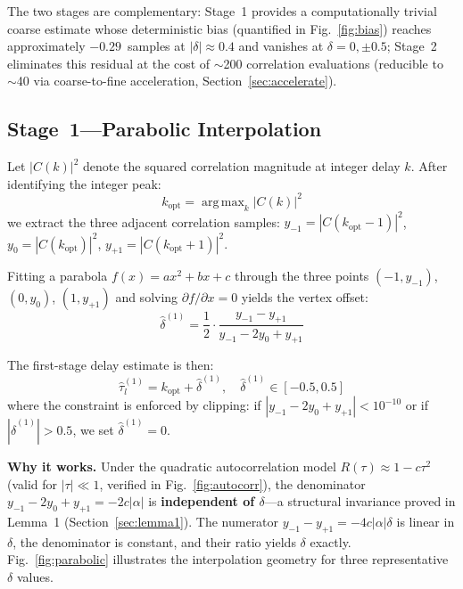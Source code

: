 \documentclass[journal]{IEEEtran}
\DeclareMathOperator*{\argmax}{arg\,max}
\begin{document}
The two stages are complementary: Stage~1 provides a computationally trivial coarse estimate whose deterministic bias (quantified in Fig.~\ref{fig:bias}) reaches approximately $-0.29$~samples at $|\delta|\approx0.4$ and vanishes at $\delta=0,\pm0.5$; Stage~2 eliminates this residual at the cost of $\sim$200 correlation evaluations (reducible to $\sim$40 via coarse-to-fine acceleration, Section~\ref{sec:accelerate}).

\subsection{Stage~1---Parabolic Interpolation}

Let $|C(k)|^2$ denote the squared correlation magnitude at integer delay $k$. After identifying the integer peak:
\begin{equation}
k_{\text{opt}} = \argmax_k |C(k)|^2
\label{eq:kopt}
\end{equation}
we extract the three adjacent correlation samples: $y_{-1} = |C(k_{\text{opt}}-1)|^2$, $y_0 = |C(k_{\text{opt}})|^2$, $y_{+1} = |C(k_{\text{opt}}+1)|^2$.

Fitting a parabola $f(x) = ax^2 + bx + c$ through the three points $(-1, y_{-1})$, $(0, y_0)$, $(1, y_{+1})$ and solving $\partial f/\partial x = 0$ yields the vertex offset:
\begin{equation}
\hat{\delta}^{(1)} = \frac{1}{2} \cdot \frac{y_{-1} - y_{+1}}{y_{-1} - 2y_0 + y_{+1}}
\label{eq:delta1}
\end{equation}

The first-stage delay estimate is then:
\begin{equation}
\hat{\tau}_l^{(1)} = k_{\text{opt}} + \hat{\delta}^{(1)}, \quad \hat{\delta}^{(1)} \in [-0.5, 0.5]
\label{eq:tau1}
\end{equation}
where the constraint is enforced by clipping: if $|y_{-1} - 2y_0 + y_{+1}| < 10^{-10}$ or if $|\hat{\delta}^{(1)}| > 0.5$, we set $\hat{\delta}^{(1)} = 0$.

\textbf{Why it works.} Under the quadratic autocorrelation model $R(\tau) \approx 1 - c\tau^2$ (valid for $|\tau| \ll 1$, verified in Fig.~\ref{fig:autocorr}), the denominator $y_{-1} - 2y_0 + y_{+1} = -2c|\alpha|$ is \textbf{independent of $\delta$}---a structural invariance proved in Lemma~1 (Section~\ref{sec:lemma1}). The numerator $y_{-1} - y_{+1} = -4c|\alpha|\delta$ is linear in $\delta$, the denominator is constant, and their ratio yields $\delta$ exactly. Fig.~\ref{fig:parabolic} illustrates the interpolation geometry for three representative $\delta$ values.
\end{document}
